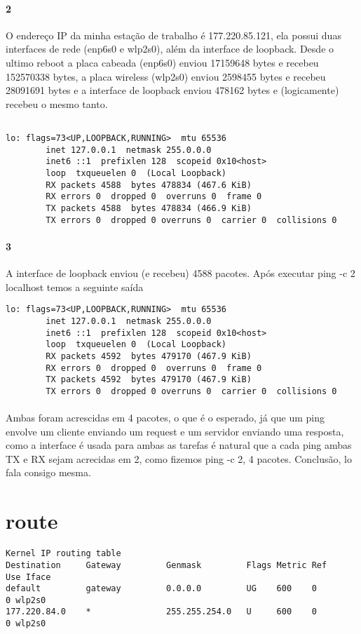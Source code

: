\documentclass{article}
\begin{document}
\paragraph{2} O endereço IP  da minha estação de trabalho é
177.220.85.121, ela possui duas interfaces de rede (enp6s0 e wlp2s0), além da interface de loopback. Desde o ultimo reboot a placa cabeada (enp6s0) enviou 17159648 bytes e recebeu 152570338 bytes, a placa wireless (wlp2s0) enviou 2598455 bytes e recebeu 28091691 bytes e a interface de loopback enviou 478162 bytes e (logicamente) recebeu o mesmo tanto.

\begin{verbatim}

lo: flags=73<UP,LOOPBACK,RUNNING>  mtu 65536
        inet 127.0.0.1  netmask 255.0.0.0
        inet6 ::1  prefixlen 128  scopeid 0x10<host>
        loop  txqueuelen 0  (Local Loopback)
        RX packets 4588  bytes 478834 (467.6 KiB)
        RX errors 0  dropped 0  overruns 0  frame 0
        TX packets 4588  bytes 478834 (466.9 KiB)
        TX errors 0  dropped 0 overruns 0  carrier 0  collisions 0
\end{verbatim}
\paragraph{3} A interface de loopback enviou (e recebeu) 4588 pacotes. Após executar ping -c 2 localhost temos a seguinte saída
\begin{verbatim}
lo: flags=73<UP,LOOPBACK,RUNNING>  mtu 65536
        inet 127.0.0.1  netmask 255.0.0.0
        inet6 ::1  prefixlen 128  scopeid 0x10<host>
        loop  txqueuelen 0  (Local Loopback)
        RX packets 4592  bytes 479170 (467.9 KiB)
        RX errors 0  dropped 0  overruns 0  frame 0
        TX packets 4592  bytes 479170 (467.9 KiB)
        TX errors 0  dropped 0 overruns 0  carrier 0  collisions 0
\end{verbatim}
\paragraph{} Ambas foram acrescidas em 4 pacotes, o que é o esperado, já que um ping envolve um cliente enviando um request e um servidor enviando uma resposta, como a interface é usada para ambas as tarefas é natural que a cada ping ambas TX e RX sejam acrecidas em 2, como fizemos ping -c 2, 4 pacotes. Conclusão, lo fala consigo mesma.
\section*{route}
\begin{verbatim}
Kernel IP routing table
Destination     Gateway         Genmask         Flags Metric Ref    Use Iface
default         gateway         0.0.0.0         UG    600    0        0 wlp2s0
177.220.84.0    *               255.255.254.0   U     600    0        0 wlp2s0
\end{verbatim}
\end{document}
